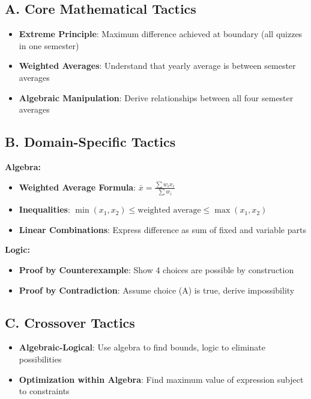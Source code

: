 \documentclass[12pt]{article}
\begin{document}
\begin{tacticalbox}
\subsection*{A. Core Mathematical Tactics}
\begin{itemize}[leftmargin=*]
    \item \textbf{Extreme Principle}: Maximum difference achieved at boundary (all quizzes in one semester)
    \item \textbf{Weighted Averages}: Understand that yearly average is between semester averages
    \item \textbf{Algebraic Manipulation}: Derive relationships between all four semester averages
\end{itemize}

\subsection*{B. Domain-Specific Tactics}

\textbf{Algebra:}
\begin{itemize}[leftmargin=*]
    \item \textbf{Weighted Average Formula}: $\bar{x} = \frac{\sum w_i x_i}{\sum w_i}$
    \item \textbf{Inequalities}: $\min(x_1, x_2) \leq \text{weighted average} \leq \max(x_1, x_2)$
    \item \textbf{Linear Combinations}: Express difference as sum of fixed and variable parts
\end{itemize}

\textbf{Logic:}
\begin{itemize}[leftmargin=*]
    \item \textbf{Proof by Counterexample}: Show 4 choices are possible by construction
    \item \textbf{Proof by Contradiction}: Assume choice (A) is true, derive impossibility
\end{itemize}

\subsection*{C. Crossover Tactics}
\begin{itemize}[leftmargin=*]
    \item \textbf{Algebraic-Logical}: Use algebra to find bounds, logic to eliminate possibilities
    \item \textbf{Optimization within Algebra}: Find maximum value of expression subject to constraints
\end{itemize}
\end{tacticalbox}
\end{document}
